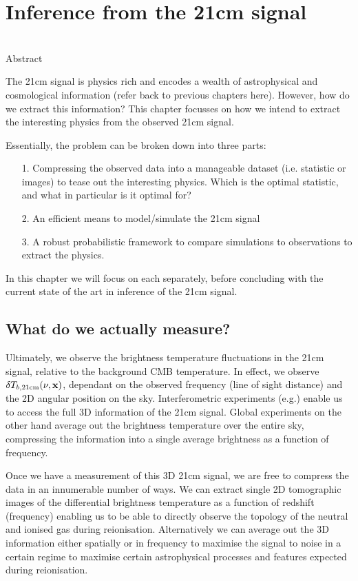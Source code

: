 \chapter{Inference from the 21cm signal}

\begin{bf}
  \author{Bradley Greig}\\
  
Abstract\\
\end{bf}

The 21cm signal is physics rich and encodes a wealth of astrophysical and cosmological information (refer back to previous chapters here). However, how do we extract this information? This chapter focusses on how we intend to extract the interesting physics from the observed 21cm signal.

Essentially, the problem can be broken down into three parts:
\begin{itemize}
\item[1.] Compressing the observed data into a manageable dataset (i.e. statistic or images) to tease out the interesting physics. Which is the optimal statistic, and what in particular is it optimal for?
\item[2.] An efficient means to model/simulate the 21cm signal
\item[3.] A robust probabilistic framework to compare simulations to observations to extract the physics.
\end{itemize}
\noindent
In this chapter we will focus on each separately, before concluding with the current state of the art in inference of the 21cm signal.

\section{What do we actually measure?}

Ultimately, we observe the brightness temperature fluctuations in the 21cm signal, relative to the background CMB temperature. In effect, we observe $\delta T_{b,\rm 21cm}(\nu,\mathbf{x})$, dependant on the observed frequency (line of sight distance) and the 2D angular position on the sky. Interferometric experiments (e.g.) enable us to access the full 3D information of the 21cm signal. Global experiments on the other hand average out the brightness temperature over the entire sky, compressing the information into a single average brightness as a function of frequency.

Once we have a measurement of this 3D 21cm signal, we are free to compress the data in an innumerable number of ways. We can extract single 2D tomographic images of the differential brightness temperature as a function of redshift (frequency) enabling us to be able to directly observe the topology of the neutral and ionised gas during reionisation. Alternatively we can average out the 3D information either spatially or in frequency to maximise the signal to noise in a certain regime to maximise certain astrophysical processes and features expected during reionisation.

